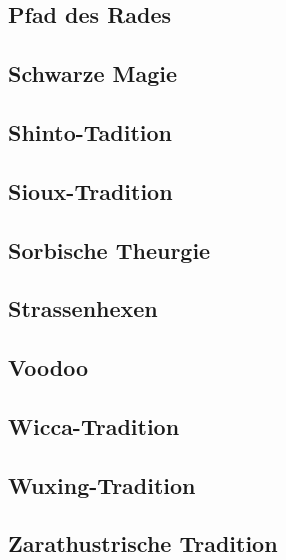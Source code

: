 \documentclass[a4paper, 10pt, twocolumn, twoside]{book}
\begin{document}
\subsection{Pfad des Rades}
\lipsum
\subsection{Schwarze Magie}
\lipsum
\subsection{Shinto-Tadition}
\lipsum
\subsection{Sioux-Tradition}
\lipsum
\subsection{Sorbische Theurgie}
\lipsum
\subsection{Strassenhexen}
\lipsum
\subsection{Voodoo}
\lipsum
\subsection{Wicca-Tradition}
\lipsum
\subsection{Wuxing-Tradition}
\lipsum
\subsection{Zarathustrische Tradition}
\lipsum
\end{document}
